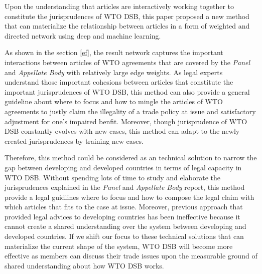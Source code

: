 Upon the understanding that articles are interactively working together to 
constitute the jurisprudences of WTO DSB, 
this paper proposed a new method that can materialize the relationship between articles 
in a form of weighted and directed network using deep and machine learning. 

As shown in the section \ref{ef}, the result network captures the important interactions 
between articles of WTO agreements that are covered by the \textit{Panel} and \textit{Appellate Body} with relatively large edge weights.
As legal experts understand those important cohesions between articles that constitute the important jurisprudences of WTO DSB,
this method can also provide a general guideline about where to focus and how to mingle the articles of WTO agreements to justly claim 
the illegality of a trade policy at issue and satisfactory adjustment for one's impaired benfit. Moreover, though jurisprudence of WTO DSB constantly 
evolves with new cases, this method can adapt to the newly created jurisprudences by training new cases.

Therefore, this method could be considered as an technical solution to narrow the gap between developing and developed countries in terms of legal capacity in WTO DSB.
Without spending lots of time to study and elaborate the jurisprudences explained in the \textit{Panel} and \textit{Appellate Body} report, this method provide a legal guidlines where to focus and how to compose the legal claim with which articles that fits to the case at issue.
Moreover, previous approach that provided legal advices to developing countries has been ineffective because it cannot create a shared understanding over the system between developing and developed countries.
If we shift our focus to these technical solutions that can materialize the current shape of the system, WTO DSB
will become more effective as members can discuss their trade issues upon the measurable ground of shared understanding about how WTO DSB works.









